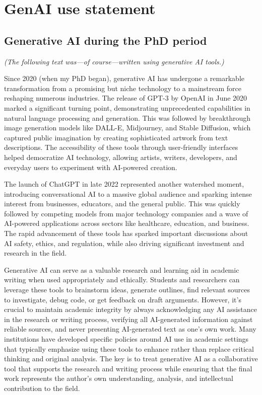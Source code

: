 \chapter{GenAI use statement}
\label{appendix:ai}

\section*{Generative AI during the PhD period}

\textit{(The following text was---of course---written using generative AI tools.)}

Since 2020 (when my PhD began), generative AI has undergone a remarkable transformation from a promising but niche technology to a mainstream force reshaping numerous industries.
The release of GPT-3 by OpenAI in June 2020 marked a significant turning point, demonstrating unprecedented capabilities in natural language processing and generation.
This was followed by breakthrough image generation models like DALL-E, Midjourney, and Stable Diffusion, which captured public imagination by creating sophisticated artwork from text descriptions.
The accessibility of these tools through user-friendly interfaces helped democratize AI technology, allowing artists, writers, developers, and everyday users to experiment with AI-powered creation.

The launch of ChatGPT in late 2022 represented another watershed moment, introducing conversational AI to a massive global audience and sparking intense interest from businesses, educators, and the general public.
This was quickly followed by competing models from major technology companies and a wave of AI-powered applications across sectors like healthcare, education, and business.
The rapid advancement of these tools has sparked important discussions about AI safety, ethics, and regulation, while also driving significant investment and research in the field.

Generative AI can serve as a valuable research and learning aid in academic writing when used appropriately and ethically.
Students and researchers can leverage these tools to brainstorm ideas, generate outlines, find relevant sources to investigate, debug code, or get feedback on draft arguments.
However, it's crucial to maintain academic integrity by always acknowledging any AI assistance in the research or writing process, verifying all AI-generated information against reliable sources, and never presenting AI-generated text as one's own work.
Many institutions have developed specific policies around AI use in academic settings that typically emphasize using these tools to enhance rather than replace critical thinking and original analysis.
The key is to treat generative AI as a collaborative tool that supports the research and writing process while ensuring that the final work represents the author's own understanding, analysis, and intellectual contribution to the field.

